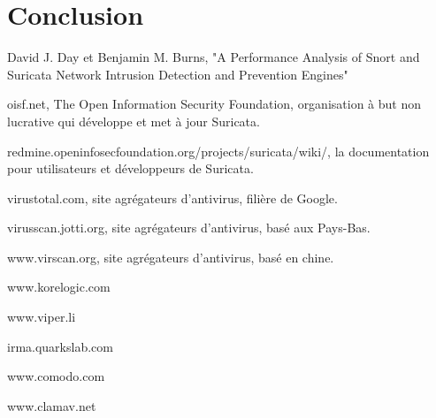 \documentclass[smallextended]{svjour3}       %
\begin{document}
\newpage
\section{Conclusion}
\label{sec5:conclusion}



\newpage
\begin{thebibliography}{}
%

David J. Day et Benjamin M. Burns, "A Performance Analysis of Snort and Suricata Network Intrusion Detection and Prevention Engines"

oisf.net, The Open Information Security Foundation, organisation à but non lucrative qui développe et met à jour Suricata.

redmine.openinfosecfoundation.org/projects/suricata/wiki/, la documentation pour utilisateurs et développeurs de Suricata.

virustotal.com, site agrégateurs d'antivirus, filière de Google.

virusscan.jotti.org, site agrégateurs d'antivirus, basé aux Pays-Bas.

www.virscan.org, site agrégateurs d'antivirus, basé en chine.

www.korelogic.com

www.viper.li

irma.quarkslab.com

www.comodo.com

www.clamav.net

%

\end{thebibliography}
\end{document}
